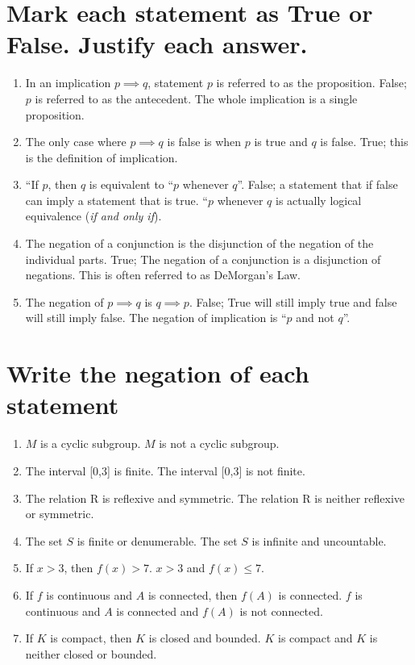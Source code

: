 \documentclass[11pt]{article} %
\begin{document}
\section{Mark each statement as True or False. Justify each answer.}
\begin{enumerate}
	\item In an implication $p \implies q$, statement $p$ is referred to as the proposition.
	\subitem False; $p$ is referred to as the antecedent. The whole implication is a single proposition.
	
	\item The only case where $p \implies q$ is false is when $p$ is true and $q$ is false.
	\subitem True; this is the definition of implication.
	
	\item ``If $p$, then $q$ is equivalent to ``$p$ whenever $q$''.
	\subitem False; a statement that if false can imply a statement that is true. ``$p$ whenever $q$ is actually logical equivalence (\textit{if and only if}).
	
	\item The negation of a conjunction is the disjunction of the negation of the individual parts.
	\subitem True; The negation of a conjunction is a disjunction of negations. This is often referred to as DeMorgan's Law.
	
	\item The negation of $p \implies q$ is $q \implies p$.
	\subitem False; True will still imply true and false will still imply false. The negation of implication is ``$p$ and not $q$''.
	
\end{enumerate}

\section{Write the negation of each statement}
\begin{enumerate}
	\item$M$ is a cyclic subgroup.
	\subitem $M$ is not a cyclic subgroup.
	
	\item The interval [0,3] is finite.
	\subitem The interval [0,3] is not finite.
	
	\item The relation R is reflexive and symmetric.
	\subitem The relation R is neither reflexive or symmetric.
	
	\item The set $S$ is finite or denumerable.
	\subitem The set $S$ is infinite and uncountable.
	
	\item If $x>3$, then $f(x)>7$.
	\subitem $x>3$ and $f(x) \leq 7$.
	
	\item If $f$ is continuous and $A$ is connected, then $f(A)$ is connected.
	\subitem $f$ is continuous and $A$ is connected and $f(A)$ is not connected.
	
	\item If $K$ is compact, then $K$ is closed and bounded.
	\subitem $K$ is compact and $K$ is neither closed or bounded.
\end{enumerate}
\end{document}
